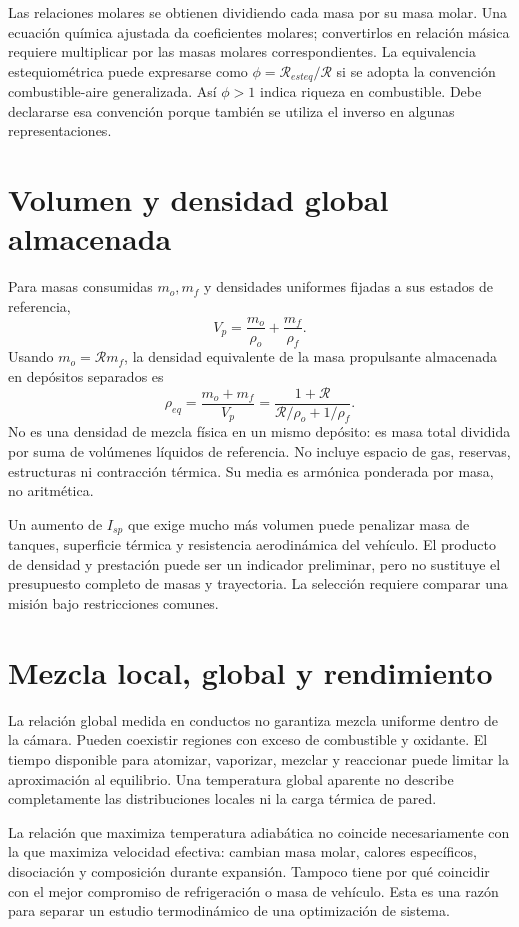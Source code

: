 Las relaciones molares se obtienen dividiendo cada masa por su masa molar. Una ecuación química ajustada da coeficientes molares; convertirlos en relación másica requiere multiplicar por las masas molares correspondientes. La equivalencia estequiométrica puede expresarse como $\phi=\mathcal R_{esteq}/\mathcal R$ si se adopta la convención combustible-aire generalizada. Así $\phi>1$ indica riqueza en combustible. Debe declararse esa convención porque también se utiliza el inverso en algunas representaciones.
\section{Volumen y densidad global almacenada}
Para masas consumidas $m_o,m_f$ y densidades uniformes fijadas a sus estados de referencia,
\[
 V_p=\frac{m_o}{\rho_o}+\frac{m_f}{\rho_f}.
\]
Usando $m_o=\mathcal Rm_f$, la densidad equivalente de la masa propulsante almacenada en depósitos separados es
\begin{equation}
 \rho_{eq}=\frac{m_o+m_f}{V_p}
 =\frac{1+\mathcal R}{\mathcal R/\rho_o+1/\rho_f}.
\end{equation}
No es una densidad de mezcla física en un mismo depósito: es masa total dividida por suma de volúmenes líquidos de referencia. No incluye espacio de gas, reservas, estructuras ni contracción térmica. Su media es armónica ponderada por masa, no aritmética.

Un aumento de $I_{sp}$ que exige mucho más volumen puede penalizar masa de tanques, superficie térmica y resistencia aerodinámica del vehículo. El producto de densidad y prestación puede ser un indicador preliminar, pero no sustituye el presupuesto completo de masas y trayectoria. La selección requiere comparar una misión bajo restricciones comunes.
\section{Mezcla local, global y rendimiento}
La relación global medida en conductos no garantiza mezcla uniforme dentro de la cámara. Pueden coexistir regiones con exceso de combustible y oxidante. El tiempo disponible para atomizar, vaporizar, mezclar y reaccionar puede limitar la aproximación al equilibrio. Una temperatura global aparente no describe completamente las distribuciones locales ni la carga térmica de pared.

La relación que maximiza temperatura adiabática no coincide necesariamente con la que maximiza velocidad efectiva: cambian masa molar, calores específicos, disociación y composición durante expansión. Tampoco tiene por qué coincidir con el mejor compromiso de refrigeración o masa de vehículo. Esta es una razón para separar un estudio termodinámico de una optimización de sistema.

